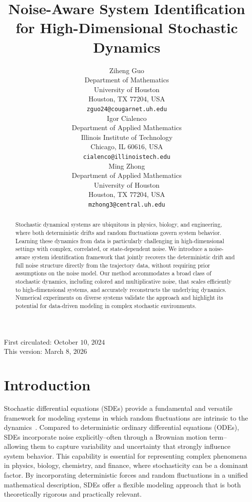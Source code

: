\documentclass[11pt]{article} %
\title{Noise-Aware System Identification for High-Dimensional Stochastic Dynamics}
\author{Ziheng Guo \\
Department of Mathematics\\
University of Houston\\
Houston, TX $77204$, USA \\
\texttt{zguo24@cougarnet.uh.edu} \\
\And
Igor Cialenco \\
Department of Applied Mathematics \\
Illinois Institute of Technology \\
Chicago, IL $60616$, USA\\
\texttt{cialenco@illinoistech.edu} \\
\And
Ming Zhong \\
Department of Applied Mathematics \\
University of Houston \\
Houston, TX $77204$, USA\\
\texttt{mzhong3@central.uh.edu} \\
}
\begin{document}
\maketitle

\vspace{-2em}
\begin{center}
First circulated: October $10$, $2024$ \\
This version: March $8$, $2026$ 
\end{center}

\begin{abstract}
Stochastic dynamical systems are ubiquitous in physics, biology, and engineering, where both deterministic drifts and random fluctuations govern system behavior. Learning these dynamics from data is particularly challenging in high-dimensional settings with complex, correlated, or state-dependent noise. We introduce a noise-aware system identification framework that jointly recovers the deterministic drift and full noise structure directly from the trajectory data, without requiring prior assumptions on the noise model. Our method accommodates a broad class of stochastic dynamics, including colored and multiplicative noise, that scales efficiently to high-dimensional systems, and accurately reconstructs the underlying dynamics. Numerical experiments on diverse systems validate the approach and highlight its potential for data-driven modeling in complex stochastic environments.
\end{abstract}

\section{Introduction}\label{sec:intro}
%
Stochastic differential equations (SDEs) provide a fundamental and versatile framework for modeling systems in which random fluctuations are intrinsic to the dynamics~\citep{Evans, Sarkka_Solin_2019}. Compared to deterministic ordinary differential equations (ODEs), SDEs incorporate noise explicitly--often through a Brownian motion term--allowing them to capture variability and uncertainty that strongly influence system behavior. This capability is essential for representing complex phenomena in physics, biology, chemistry, and finance, where stochasticity can be a dominant factor. By incorporating deterministic forces and random fluctuations in a unified mathematical description, SDEs offer a flexible modeling approach that is both theoretically rigorous and practically relevant.
\end{document}
